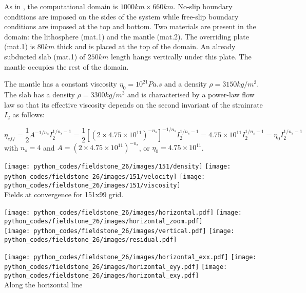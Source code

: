 
As in \cite{schm11}, the computational domain is $1000km \times 660km$.
No-slip boundary conditions are imposed on the sides of the system while free-slip
boundary conditions are imposed at the top and bottom.
Two materials are present in the domain: the lithosphere (mat.1) and the mantle (mat.2). 
The overriding plate (mat.1) is $80km$ thick and is placed at the top of the domain. 
An already subducted slab (mat.1) of $250km$ length hangs vertically under this plate.
The mantle occupies the rest of the domain.

The mantle has a constant viscosity $\eta_0=10^{21}Pa.s$ and a density $\rho=3150kg/m^3$. 
The slab has a density $\rho=3300kg/m^3$ and is characterised by a power-law flow law so that 
its effective viscosity depends on the second invariant of the strainrate $I_2$ as follows:

\begin{equation}
\eta_{eff}
=\frac{1}{2} A^{-1/n_s} I_2^{1/n_s-1} 
=\frac{1}{2} [(2 \times 4.75\!\times\! 10^{11})^{-n_s}]^{-1/n_s} I_2^{1/n_s-1} 
=4.75\!\times\! 10^{11} I_2^{1/n_s-1} 
= \eta_0 I_2^{1/n_s-1} 
\end{equation}
with 
$n_s=4$ and $A=(2 \times 4.75\!\times\! 10^{11})^{-n_s}$, or $\eta_0=4.75\times 10^{11}$.




\begin{center}
\texttt{[image: python\_codes/fieldstone\_26/images/151/density]}
\texttt{[image: python\_codes/fieldstone\_26/images/151/velocity]}
\texttt{[image: python\_codes/fieldstone\_26/images/151/viscosity]}\\
Fields at convergence for 151x99 grid.
\end{center}




\begin{center}
\texttt{[image: python\_codes/fieldstone\_26/images/horizontal.pdf]}
\texttt{[image: python\_codes/fieldstone\_26/images/horizontal\_zoom.pdf]}\\
\texttt{[image: python\_codes/fieldstone\_26/images/vertical.pdf]}
\texttt{[image: python\_codes/fieldstone\_26/images/residual.pdf]}
\end{center}

\begin{center}
\texttt{[image: python\_codes/fieldstone\_26/images/horizontal\_exx.pdf]}
\texttt{[image: python\_codes/fieldstone\_26/images/horizontal\_eyy.pdf]}
\texttt{[image: python\_codes/fieldstone\_26/images/horizontal\_exy.pdf]}\\
Along the horizontal line
\end{center}

